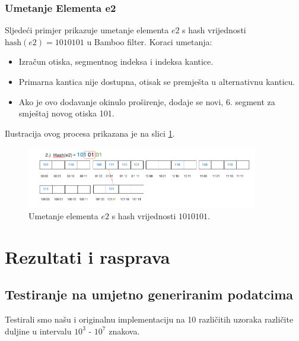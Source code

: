 \documentclass[seminarskirad]{fer}
\begin{document}
	\subsection{Umetanje Elementa e2}
	Sljedeći primjer prikazuje umetanje elementa \( e2 \) s hash vrijednosti \( \text{hash}(e2) = 1010101 \) u Bamboo filter. Koraci umetanja:
	\begin{itemize}
		\item Izračun otiska, segmentnog indeksa i indeksa kantice.
		\item Primarna kantica nije dostupna, otisak se premješta u alternativnu kanticu.
		\item Ako je ovo dodavanje okinulo proširenje, dodaje se novi, 6. segment za smještaj novog otiska 101.
	\end{itemize}
	Ilustracija ovog procesa prikazana je na slici \ref{fig:insertion_e2}.
	
	\begin{figure}[h]
		\centering
		\includegraphics[width=0.9\textwidth]{images/umetanje_el2.png}
		\caption{Umetanje elementa \( e2 \) s hash vrijednosti \( 1010101 \).}
		\label{fig:insertion_e2}
	\end{figure}
	

\chapter{Rezultati i rasprava}
\label{pog:rezultati_i_rasprava}

\section{Testiranje na umjetno generiranim podatcima}
Testirali smo našu i originalnu implementaciju na 10 različitih uzoraka različite duljine u intervalu \(10^3\) - \(10^7\) znakova. \\
\end{document}
